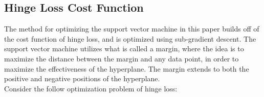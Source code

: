 \documentclass[12pt]{article}%
\begin{document}
	\subsection{Hinge Loss Cost Function}
	The method for optimizing the support vector machine in this paper builds off of the cost function of hinge loss, and is optimized using sub-gradient descent.  The support vector machine utilizes what is called a margin, where the idea is to maximize the distance between the margin and any data point, in order to maximize the effectiveness of the hyperplane.  The margin extends to both the positive and negative positions of the hyperplane.\\
	
	Consider the follow optimization problem of hinge loss:\\
	
\end{document}
